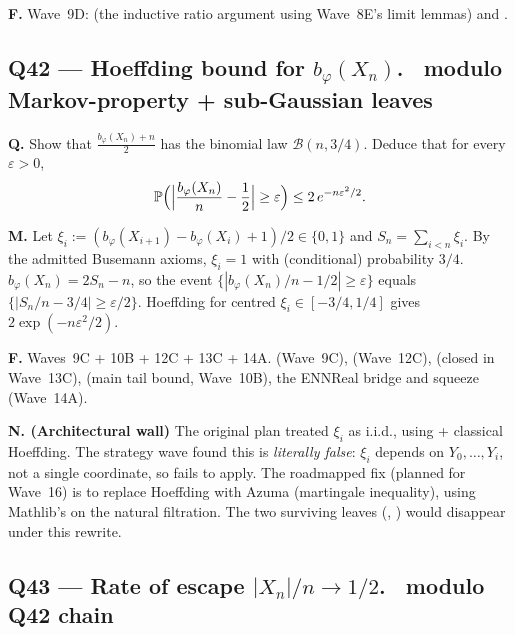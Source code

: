 \documentclass[11pt,a4paper]{article}
\newcommand{\todoc}[1]{\textcolor{todoamber}{\textbf{#1}}}
\theoremstyle{plain}
\theoremstyle{definition}
\begin{document}
\textbf{F.} Wave~9D: 
(the inductive ratio argument using Wave~8E's limit lemmas) and
.

\subsection{Q42 --- Hoeffding bound for $b_\varphi(X_n)$. \todoc{\textopenbullet}{\normalfont\ modulo Markov-property + sub-Gaussian leaves}}

\textbf{Q.} Show that $\frac{b_\varphi(X_n) + n}{2}$ has the
binomial law $\mathcal B(n, 3/4)$. Deduce that for every
$\varepsilon > 0$,
\[
\mathbb P\Bigl(\Bigl|\frac{b_\varphi(X_n)}{n} - \frac12\Bigr| \geq \varepsilon\Bigr)
\leq 2\,e^{-n \varepsilon^2 / 2}.
\]

\textbf{M.} Let $\xi_i := (b_\varphi(X_{i+1}) - b_\varphi(X_i) + 1)/2
\in \{0, 1\}$ and $S_n = \sum_{i<n} \xi_i$. By the admitted
Busemann axioms, $\xi_i = 1$ with (conditional) probability $3/4$.
$b_\varphi(X_n) = 2 S_n - n$, so the event $\{|b_\varphi(X_n)/n -
1/2| \geq \varepsilon\}$ equals $\{|S_n/n - 3/4| \geq \varepsilon/2\}$. Hoeffding
for centred $\xi_i \in [-3/4, 1/4]$ gives $2 \exp(-n \varepsilon^2 / 2)$.

\textbf{F.} Waves~9C + 10B + 12C + 13C + 14A.
 (Wave~9C),
 (Wave~12C),
 (closed in Wave~13C),
 (main tail bound, Wave~10B),
the ENNReal bridge and squeeze (Wave~14A).

\textbf{N. (Architectural wall)} The original plan treated $\xi_i$
as i.i.d., using  + classical Hoeffding. The
strategy wave found this is \emph{literally false}: $\xi_i$
depends on $Y_0, \ldots, Y_i$, not a single coordinate, so
 fails to apply. The roadmapped fix
(planned for Wave~16) is to replace Hoeffding with Azuma
(martingale inequality), using Mathlib's
 on the
natural filtration. The two surviving leaves
(, )
would disappear under this rewrite.

\subsection{Q43 --- Rate of escape $|X_n|/n \to 1/2$. \todoc{\textopenbullet}{\normalfont\ modulo Q42 chain}}
\end{document}
